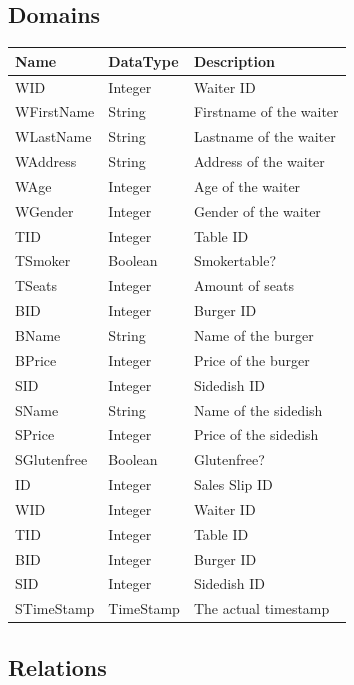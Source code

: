 \documentclass[10pt, a4paper]{article}
\begin{document}
\subsection{Domains}

\begin{tabular}[ht]{| p{4.9cm} | p{4.9cm} | p{4.9cm} |}
\hline
  	Name 		& DataType 	& Description\\
\hline\hline
  	WID                	& Integer 		& Waiter ID\\
  	WFirstName 	& String   		& Firstname of the waiter\\
  	WLastName 	& String    		& Lastname of the waiter\\
 	WAddress    	& String    		& Address of the waiter\\
 	WAge           	& Integer   	& Age of the waiter\\
 	WGender     	& Integer   	& Gender of the waiter\\
\hline
  	TID                	& Integer   	& Table ID\\
  	TSmoker      	& Boolean	& Smokertable?\\
  	TSeats      		& Integer 		& Amount of seats\\
\hline
  	BID                	& Integer   	& Burger ID\\
  	BName      	& String		& Name of the burger\\
  	BPrice      		& Integer 		& Price of the burger\\
\hline
  	SID                	& Integer   	& Sidedish ID\\
  	SName      	& String		& Name of the sidedish\\
  	SPrice      		& Integer 		& Price of the sidedish\\
	SGlutenfree      	& Boolean 	& Glutenfree?\\
\hline
  	ID                	& Integer   	& Sales Slip ID\\
  	WID                	& Integer 		& Waiter ID\\
  	TID                	& Integer   	& Table ID\\
  	BID                	& Integer   	& Burger ID\\
  	SID                	& Integer   	& Sidedish ID\\
	STimeStamp    	& TimeStamp   	& The actual timestamp\\
\hline
\end{tabular}

\subsection{Relations}
\end{document}
